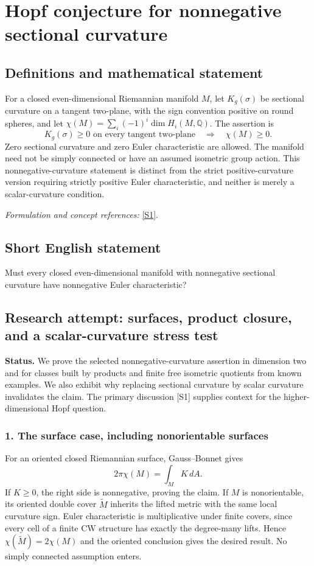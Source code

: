 \documentclass[11pt]{article}
\begin{document}
\section*{\texorpdfstring{Hopf conjecture for nonnegative sectional curvature}{Hopf conjecture for nonnegative sectional curvature}}\label{30006809}
\subsection{Definitions and mathematical statement}
For a closed even-dimensional Riemannian manifold $M$, let $K_g(\sigma)$ be sectional curvature on a tangent two-plane, with the sign convention positive on round spheres, and let
$\chi(M)=\sum_i(-1)^i\dim H_i(M,{\mathbb{Q}})$. The assertion is
\[
 K_g(\sigma)\ge0\text{ on every tangent two-plane}
 \quad\Longrightarrow\quad\chi(M)\ge0.
\]
Zero sectional curvature and zero Euler characteristic are allowed. The manifold need not be simply connected or have an assumed isometric group action. This nonnegative-curvature statement is distinct from the strict positive-curvature version requiring strictly positive Euler characteristic, and neither is merely a scalar-curvature condition.
\par\smallskip\textit{Formulation and concept references:} \href{https://link.springer.com/article/10.1365/s13291-020-00225-x}{[S1]}.

\subsection{Short English statement}
Must every closed even-dimensional manifold with nonnegative sectional curvature have nonnegative Euler characteristic?
\subsection{Research attempt: surfaces, product closure, and a scalar-curvature stress test}
\textbf{Status.} We prove the selected nonnegative-curvature assertion in dimension two and for classes built by products and finite free isometric quotients from known examples. We also exhibit why replacing sectional curvature by scalar curvature invalidates the claim. The primary discussion [S1] supplies context for the higher-dimensional Hopf question.

\subsubsection{1. The surface case, including nonorientable surfaces}
For an oriented closed Riemannian surface, Gauss--Bonnet gives
\[2\pi\chi(M)=\int_M K\,dA.\]
If $K\ge0$, the right side is nonnegative, proving the claim. If $M$ is nonorientable, its oriented double cover $\widetilde M$ inherits the lifted metric with the same local curvature sign. Euler characteristic is multiplicative under finite covers, since every cell of a finite CW structure has exactly the degree-many lifts. Hence $\chi(\widetilde M)=2\chi(M)$ and the oriented conclusion gives the desired result. No simply connected assumption enters.
\end{document}
